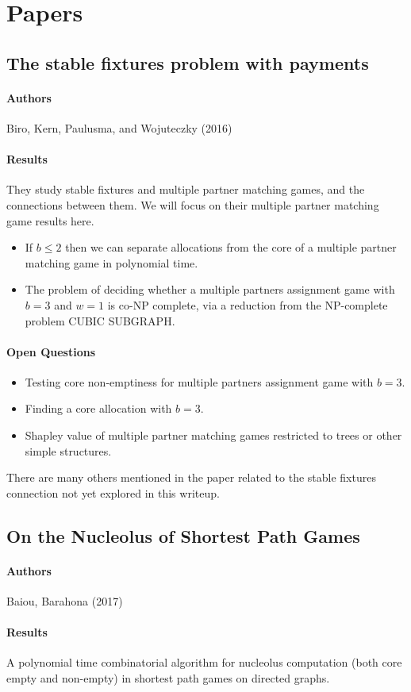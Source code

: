 \section{Papers}

\subsection{The stable fixtures problem with payments}
\paragraph{Authors} 
Biro, Kern, Paulusma, and Wojuteczky (2016) \cite{Biro2017}
\paragraph{Results}
They study stable fixtures and multiple partner matching games, and the connections between them. We will focus on their multiple partner matching game results here.
\begin{itemize}
\item If $b \leq 2$ then we can separate allocations from the core of a multiple partner matching game in polynomial time.
\item The problem of deciding whether a multiple partners assignment game with $b=3$ and $w=1$ is co-NP complete, via a reduction from the NP-complete problem CUBIC SUBGRAPH.
\end{itemize}
\paragraph{Open Questions}
\begin{itemize}
\item Testing core non-emptiness for multiple partners assignment game with $b=3$.
\item Finding a core allocation with $b=3$.
\item Shapley value of multiple partner matching games restricted to trees or other simple structures.
\end{itemize}
There are many others mentioned in the paper related to the stable fixtures connection not yet explored in this writeup.

\subsection{On the Nucleolus of Shortest Path Games}
\paragraph{Authors}
Baiou, Barahona (2017) \cite{baiou2017nucleolus}
\paragraph{Results}
A polynomial time combinatorial algorithm for nucleolus computation (both core empty and non-empty) in shortest path games on directed graphs.